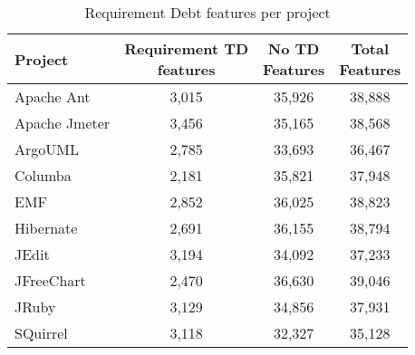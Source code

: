 \begin{table}[!hbt]
    \begin{center}
        \caption{Requirement Debt features per project}
        \label{tbl:requirement_features_per_project}
        \begin{tabular}{l| c c c }
        \toprule
        \textbf{Project} & \thead{Requirement TD\\features} & \thead{No TD\\Features} & \thead{Total\\Features} \\
        \midrule
        Apache Ant    & 3,015  & 35,926 & 38,888  \\
        Apache Jmeter & 3,456  & 35,165 & 38,568  \\
        ArgoUML       & 2,785  & 33,693 & 36,467  \\
        Columba       & 2,181  & 35,821 & 37,948  \\
        EMF           & 2,852  & 36,025 & 38,823  \\
        Hibernate     & 2,691  & 36,155 & 38,794  \\
        JEdit         & 3,194  & 34,092 & 37,233  \\
        JFreeChart    & 2,470  & 36,630 & 39,046  \\
        JRuby         & 3,129  & 34,856 & 37,931  \\
        SQuirrel      & 3,118  & 32,327 & 35,128  \\
        \bottomrule
        \end{tabular}
    \end{center}    
\end{table}

